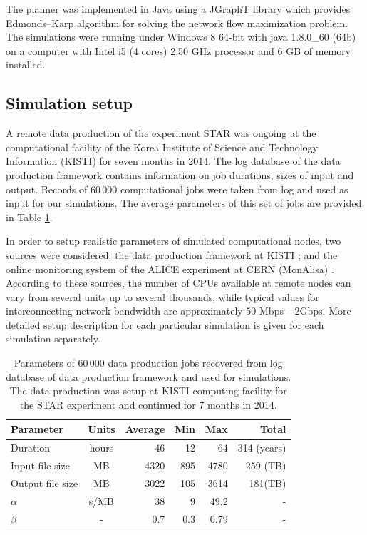 \documentclass{svjour3}                     %
\begin{document}
The planner was implemented in Java using a JGraphT \cite{JGraphT} library which provides Edmonds–Karp algorithm \cite{Network_flows} for solving the network flow maximization problem. The simulations were running under Windows 8 64-bit with java 1.8.0\_60 (64b) on a computer with Intel i5 (4 cores) 2.50 GHz processor and 6 GB of memory installed. 

\subsection{Simulation setup}
A remote data production of the experiment STAR was ongoing at the computational facility of the Korea Institute of Science and Technology Information (KISTI)\cite{KISTI} for seven months in 2014. The log database of the data production framework contains information on job durations, sizes of input and output. Records of 60\,000 computational jobs were taken from log and used as input for our simulations. The average parameters of this set of jobs are provided in Table \ref{tab:jobs}.

In order to setup realistic parameters of simulated computational nodes, two sources were considered: the data production framework at KISTI \cite{KISTI-production}; and the online monitoring system of the ALICE experiment at CERN (MonAlisa) \cite{MonAlisa}. According to these sources, the number of CPUs available at remote nodes can vary from several units up to several thousands, while typical values for interconnecting network bandwidth are approximately $50$ Mbps $- 2 $Gbps. More detailed setup description for each particular simulation is given for each simulation separately. 

\begin{table}
\caption{Parameters of 60\,000 data production jobs recovered from log database of data production framework and used for simulations. The data production was setup at KISTI computing facility for the STAR experiment and continued for 7 months in 2014.}
\label{tab:jobs}
\begin{center}
\begin{tabular}{ l  c  r  r  r	|r }
\hline %
  Parameter  & Units& Average & Min & Max & Total \\ \hline %
  Duration & hours & 46 & 12&64&314 (years) \\ 
  Input file size & MB & 4320& 895&4780&259 (TB) \\	
  Output file size & MB & 3022& 105&3614&181(TB) \\
  $\alpha$ & s/MB & 38& 9&49.2&- \\
  $\beta$ & - & 0.7& 0.3& 0.79&-\\	
  \hline %
\end{tabular}
    \end{center}
\end{table}
\end{document}
